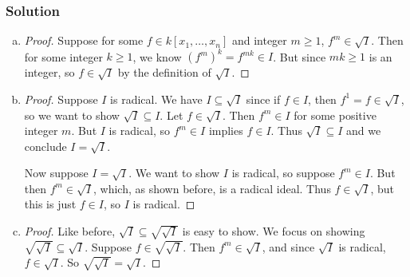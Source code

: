 \documentclass{homework}
\begin{document}
    \subsubsection{Solution}
    \begin{enumerate}[(a)]
        \item \begin{proof}
            Suppose for some $f \in k[x_1, \dots, x_n]$ and integer $m \geq 1$, $f^m \in \sqrt I$. Then for some integer $k \geq 1$, we know $(f^m)^k = f^{mk} \in I$. But since $mk \geq 1$ is an integer, so $f \in \sqrt I$ by the definition of $\sqrt I$.
        \end{proof}
        \item \begin{proof}
            Suppose $I$ is radical. We have $I \subseteq \sqrt I$ since if $f \in I$, then $f^1 = f \in \sqrt I$, so we want to show $\sqrt I \subseteq I$. Let $f \in \sqrt I$. Then $f^m \in I$ for some positive integer $m$. But $I$ is radical, so $f^m \in I$ implies $f \in I$. Thus $\sqrt I \subseteq I$ and we conclude $I = \sqrt I$.
            
            Now suppose $I = \sqrt I$. We want to show $I$ is radical, so suppose $f^m \in I$. But then $f^m \in \sqrt I$, which, as shown before, is a radical ideal. Thus $f \in \sqrt I$, but this is just $f \in I$, so $I$ is radical.
        \end{proof}
        \item \begin{proof}
            Like before, $\sqrt I \subseteq \sqrt{\sqrt{I}}$ is easy to show. We focus on showing $\sqrt{\sqrt{I}} \subseteq \sqrt I$. Suppose $f \in \sqrt{\sqrt{I}}$. Then $f^m \in \sqrt I$, and since $\sqrt I$ is radical, $f \in \sqrt I$. So $\sqrt{\sqrt{I}} = \sqrt I$.
        \end{proof}
    \end{enumerate}
\end{document}
